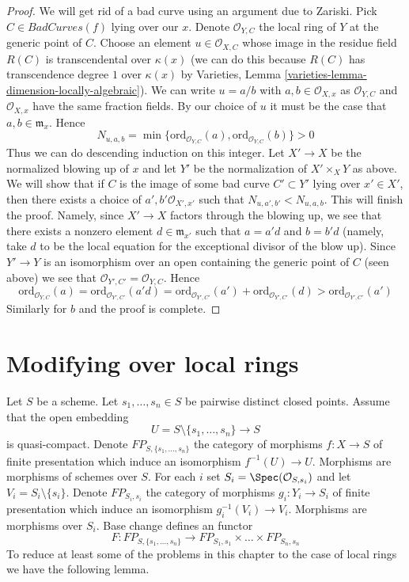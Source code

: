 \begin{proof}
\medskip\noindent
We will get rid of a bad curve using an argument due to Zariski.
Pick $C \in BadCurves(f)$ lying over our $x$. Denote $\mathcal{O}_{Y, C}$
the local ring of $Y$ at the generic point of $C$. Choose an element
$u \in \mathcal{O}_{X, C}$ whose image in the residue field
$R(C)$ is transcendental over $\kappa(x)$ (we can do this because
$R(C)$ has transcendence degree $1$ over $\kappa(x)$ by
Varieties, Lemma \ref{varieties-lemma-dimension-locally-algebraic}).
We can write $u = a/b$ with $a, b \in \mathcal{O}_{X, x}$ as
$\mathcal{O}_{Y, C}$ and $\mathcal{O}_{X, x}$ have the same
fraction fields. By our choice of $u$ it must be the case that
$a, b \in \mathfrak m_x$. Hence
$$
N_{u, a, b} = \min
\{\text{ord}_{\mathcal{O}_{Y, C}}(a), \text{ord}_{\mathcal{O}_{Y, C}}(b)\} > 0
$$
Thus we can do descending induction on this integer.
Let $X' \to X$ be the normalized blowing up of $x$
and let $Y'$ be the normalization of $X' \times_X Y$ as above. We will
show that if $C$ is the image of some bad curve $C' \subset Y'$
lying over $x' \in X'$, then
there exists a choice of $a', b' \mathcal{O}_{X', x'}$
such that $N_{u, a', b'} < N_{u, a, b}$. This will finish the proof.
Namely, since $X' \to X$ factors through the blowing up, we see that
there exists a nonzero element $d \in \mathfrak m_{x'}$ such that
$a = a' d$ and $b = b' d$ (namely, take $d$ to be the local equation
for the exceptional divisor of the blow up). Since $Y' \to Y$
is an isomorphism over an open containing the generic point of $C$
(seen above) we see that $\mathcal{O}_{Y', C'} = \mathcal{O}_{Y, C}$.
Hence
$$
\text{ord}_{\mathcal{O}_{Y, C}}(a) =
\text{ord}_{\mathcal{O}_{Y', C'}}(a' d) =
\text{ord}_{\mathcal{O}_{Y', C'}}(a') +
\text{ord}_{\mathcal{O}_{Y', C'}}(d) >
\text{ord}_{\mathcal{O}_{Y', C'}}(a')
$$
Similarly for $b$ and the proof is complete.
\end{proof}






\section{Modifying over local rings}
\label{section-modifications}

\noindent
Let $S$ be a scheme. Let $s_1, \ldots, s_n \in S$ be pairwise distinct
closed points. Assume that the open embedding
$$
U = S \setminus \{s_1, \ldots, s_n\} \longrightarrow S
$$
is quasi-compact. Denote $FP_{S, \{s_1, \ldots, s_n\}}$
the category of morphisms $f : X \to S$ of finite presentation
which induce an isomorphism $f^{-1}(U) \to U$.
Morphisms are morphisms of schemes over $S$.
For each $i$ set $S_i = \Spec(\mathcal{O}_{S, s_i})$
and let $V_i = S_i \setminus \{s_i\}$. Denote
$FP_{S_i, s_i}$ the category of
morphisms $g_i : Y_i \to S_i$ of finite presentation which induce an
isomorphism $g_i^{-1}(V_i) \to V_i$.
Morphisms are morphisms over $S_i$.
Base change defines an functor
\begin{equation}
\label{equation-equivalence}
F :
FP_{S, \{s_1, \ldots, s_n\}}
\longrightarrow
FP_{S_1, s_1} \times \ldots \times FP_{S_n, s_n}
\end{equation}
To reduce at least some of the problems in this chapter to the case
of local rings we have the following lemma.

